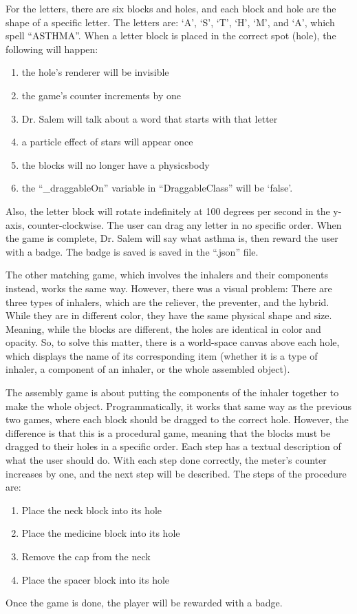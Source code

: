 For the letters, there are six blocks and holes, and each block and hole are the shape of a specific letter. The letters are: ‘A’, ‘S’, ‘T’, ‘H’, ‘M’, and ‘A’, which spell “ASTHMA”. When a letter block is placed in the correct spot (hole), the following will happen: 
\begin{enumerate}
\item{the hole's renderer will be invisible}
\item{the game’s counter increments by one}
\item{Dr. Salem will talk about a word that starts with that letter}
\item{a particle effect of stars will appear once}
\item{the blocks will no longer have a physicsbody}
\item{the “{\codefont \_draggableOn}” variable in “{\codefont DraggableClass}” will be ‘{\codefont false}’.}
\end{enumerate}
Also, the letter block will rotate indefinitely at 100 degrees per second in the y-axis, counter-clockwise. The user can drag any letter in no specific order. When the game is complete, Dr. Salem will say what asthma is, then reward the user with a badge. The badge is saved is saved in the “.json” file.

The other matching game, which involves the inhalers and their components instead, works the same way. However, there was a visual problem: There are three types of inhalers, which are the reliever, the preventer, and the hybrid. While they are in different color, they have the same physical shape and size. Meaning, while the blocks are different, the holes are identical in color and opacity. So, to solve this matter, there is a world-space canvas above each hole, which displays the name of its corresponding item (whether it is a type of inhaler, a component of an inhaler, or the whole assembled object).

The assembly game is about putting the components of the inhaler together to make the whole object. Programmatically, it works that same way as the previous two games, where each block should be dragged to the correct hole. However, the difference is that this is a procedural game, meaning that the blocks must be dragged to their holes in a specific order. Each step has a textual description of what the user should do. With each step done correctly, the meter’s counter increases by one, and the next step will be described. The steps of the procedure are:
\begin{enumerate}
\item{Place the neck block into its hole}

\item{Place the medicine block into its hole}

\item{Remove the cap from the neck}

\item{Place the spacer block into its hole}
\end{enumerate}
Once the game is done, the player will be rewarded with a badge.
